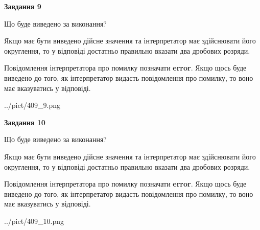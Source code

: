 \documentclass[12pt, ukrainian]{article}
\begin{document}
{\begin {Large}
{\begin {center}\textbf{Завдання 9}\end {center}}\par
Що буде виведено за виконання? \par

Якщо має бути виведено дійсне значення та інтерпретатор має здійснювати його округлення, 
то у відповіді достатньо правильно вказати два дробових розряди.

Повідомлення інтерпретатора про помилку позначати \textbf{error}.
Якщо щось буде виведено до того, як інтерпретатор видасть повідомлення про помилку, 
то воно має вказуватись у відповіді. \par

\begin{center}
	{../pict/409_9.png}
\end{center}
\newpage

{\begin {center}\textbf{Завдання 10}\end {center}}\par
Що буде виведено за виконання? \par

Якщо має бути виведено дійсне значення та інтерпретатор має здійснювати його округлення, 
то у відповіді достатньо правильно вказати два дробових розряди.

Повідомлення інтерпретатора про помилку позначати \textbf{error}.
Якщо щось буде виведено до того, як інтерпретатор видасть повідомлення про помилку, 
то воно має вказуватись у відповіді. \par

\begin{center}
	{../pict/409_10.png}
\end{center}
\newpage

\end {Large}}
\end{document}
